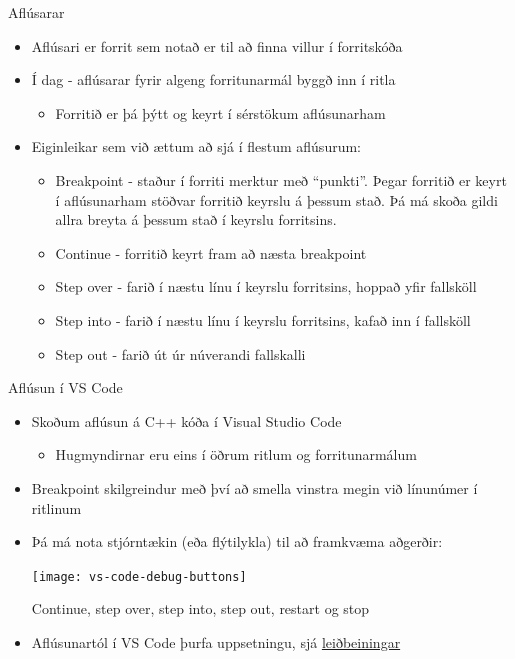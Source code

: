 \documentclass{beamer}
\begin{document}
\begin{frame}{Aflúsarar}
	\begin{itemize}
		\item Aflúsari er forrit sem notað er til að finna villur í forritskóða
		\item Í dag - aflúsarar fyrir algeng forritunarmál byggð inn í ritla
		      \begin{itemize}
			      \item Forritið er þá þýtt og keyrt í sérstökum aflúsunarham
		      \end{itemize}
		\item Eiginleikar sem við ættum að sjá í flestum aflúsurum:
		      \begin{itemize}
			      \item Breakpoint - staður í forriti merktur með ``punkti''. Þegar forritið er keyrt í aflúsunarham stöðvar forritið keyrslu á þessum stað. Þá má skoða gildi allra breyta á þessum stað í keyrslu forritsins.
			      \item Continue - forritið keyrt fram að næsta breakpoint
			      \item Step over - farið í næstu línu í keyrslu forritsins, hoppað yfir fallsköll
			      \item Step into - farið í næstu línu í keyrslu forritsins,
			            kafað inn í fallsköll
			      \item Step out - farið út úr núverandi fallskalli
		      \end{itemize}
	\end{itemize}
\end{frame}

\begin{frame}{Aflúsun í VS Code}
	\begin{itemize}
		\item Skoðum aflúsun á C++ kóða í Visual Studio Code
		      \begin{itemize}
			      \item Hugmyndirnar eru eins í öðrum ritlum og forritunarmálum
		      \end{itemize}
		\item Breakpoint skilgreindur með því að smella vinstra megin við línunúmer í ritlinum
		\item Þá má nota stjórntækin (eða flýtilykla) til að framkvæma aðgerðir:
		      \begin{center}
			      \texttt{[image: vs-code-debug-buttons]}
		      \end{center}
		      Continue, step over, step into, step out, restart og stop
		\item Aflúsunartól í VS Code þurfa uppsetningu, sjá \href{https://code.visualstudio.com/Docs/editor/debugging}{leiðbeiningar}
	\end{itemize}
\end{frame}
\end{document}
